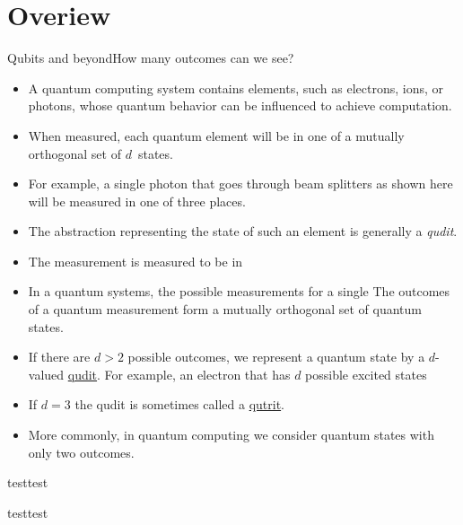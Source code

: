 
\section{Overiew}
\begin{frame}{Qubits and beyond}{How many outcomes can we see?}
\begin{itemize}
    \item A quantum computing system contains elements, such as electrons, ions, or photons, whose quantum behavior can be influenced to achieve computation.
    \item When measured, each quantum element will be in one of a mutually orthogonal set of $d$~states.
    \item For example, a single photon that goes through beam splitters as shown here will be measured in one of three places.
    \item The abstraction representing the state of such an element is generally a \emph{qudit}.
    \item The measurement is measured to be in 
    \item In a quantum systems, the possible measurements for a single The outcomes of a quantum measurement form a mutually orthogonal set of quantum states.
    \item If there are $d>2$ possible outcomes, we represent a quantum state by a $d$-valued 
    \href{https://en.wiktionary.org/wiki/qudit}{qudit}.  For example, an electron that has $d$ possible excited states 
    \item If $d=3$ the qudit is sometimes called
    a \href{https://en.wikipedia.org/wiki/Qutrit}{qutrit}.
    \item More commonly, in quantum computing we consider quantum states with only two outcomes.  
    
\end{itemize}
\end{frame}
\begin{frame}{test}{test}
\begin{TIKZP}
    \LightSource{}
\end{TIKZP}

\end{frame}
\begin{frame}{test}{test}
\begin{TIKZP}
    \LightSource{}
\end{TIKZP}
    
\end{frame}
